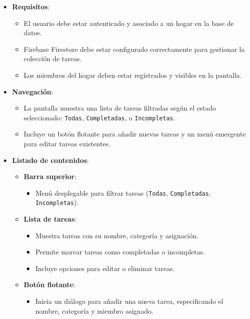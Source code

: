 \documentclass{article}
\begin{document}
\begin{flushleft}
\begin{itemize}
    \item \textbf{Requisitos}:
    \begin{itemize}
        \item El usuario debe estar autenticado y asociado a un hogar en la base de datos.
        \item Firebase Firestore debe estar configurado correctamente para gestionar la colecci\'on de tareas.
        \item Los miembros del hogar deben estar registrados y visibles en la pantalla.
    \end{itemize}

    \item \textbf{Navegaci\'on}:
    \begin{itemize}
        \item La pantalla muestra una lista de tareas filtradas seg\'un el estado seleccionado: \texttt{Todas}, \texttt{Completadas}, o \texttt{Incompletas}.
        \item Incluye un bot\'on flotante para a\~nadir nuevas tareas y un men\'u emergente para editar tareas existentes.
    \end{itemize}

    \item \textbf{Listado de contenidos}:
    \begin{itemize}
        \item \textbf{Barra superior}:
        \begin{itemize}
            \item Men\'u desplegable para filtrar tareas (\texttt{Todas}, \texttt{Completadas}, \texttt{Incompletas}).
        \end{itemize}
        \item \textbf{Lista de tareas}:
        \begin{itemize}
            \item Muestra tareas con su nombre, categor\'ia y asignaci\'on.
            \item Permite marcar tareas como completadas o incompletas.
            \item Incluye opciones para editar o eliminar tareas.
        \end{itemize}
        \item \textbf{Bot\'on flotante}: 
        \begin{itemize}
            \item Inicia un di\'alogo para a\~nadir una nueva tarea, especificando el nombre, categor\'ia y miembro asignado.
        \end{itemize}
    \end{itemize}


\end{itemize}
\end{flushleft}
\end{document}
